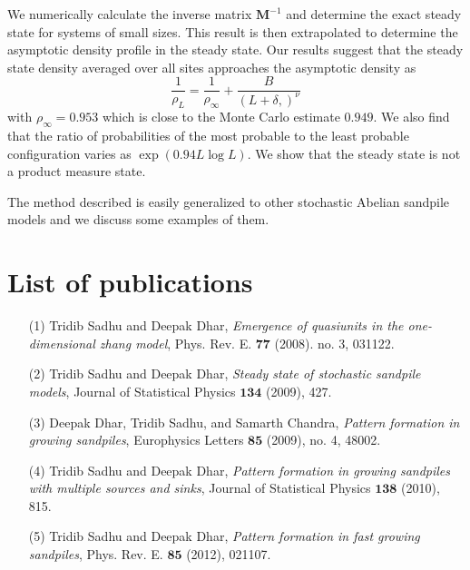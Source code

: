 \documentclass[11pt,a4paper]{book}
\begin{document}
We numerically calculate the inverse matrix $\mathbf{M}^{-1}$ and
determine the exact steady state for systems of small sizes. This
result is then extrapolated to determine the asymptotic density
profile in the steady state. Our results suggest that
the steady state density averaged over all sites approaches the
asymptotic density as
\begin{equation}
\frac{1}{\rho_{L}}=\frac{1}{\rho_{\infty}}+\frac{B}{\left( L+\delta,
\right)^{\nu}}
\end{equation}
with $\rho_{\infty}=0.953$ which is close to the Monte Carlo estimate
$0.949$. We also find that the ratio of probabilities of the most
probable to the least probable configuration varies as $\exp{\left(
0.94 L \log L \right)}$. We show that the steady state is not a
product measure state.

The method described is easily generalized to other stochastic Abelian sandpile
models and we discuss some examples of them.







\chapter{List of publications}
\begin{itemize}
\item[(1)]Tridib Sadhu and Deepak Dhar, \textit{Emergence of quasiunits
in the one-dimensional zhang model}, Phys. Rev. E. $\mathbf{77}$
(2008). no. 3, 031122.
\item[(2)]Tridib Sadhu and Deepak Dhar, \textit{Steady state of
stochastic sandpile models}, Journal of Statistical Physics
$\mathbf{134}$ (2009), 427.
\item[(3)]Deepak Dhar, Tridib Sadhu, and Samarth Chandra,
\textit{Pattern formation in growing sandpiles}, Europhysics
Letters $\mathbf{85}$ (2009), no. 4, 48002.
\item[(4)] Tridib Sadhu and Deepak Dhar, \textit{Pattern formation in
growing sandpiles with multiple sources and sinks}, Journal of
Statistical Physics $\mathbf{138}$ (2010), 815.
\item[(5)] Tridib Sadhu and Deepak Dhar, \textit{Pattern formation in
fast growing sandpiles}, Phys. Rev. E. $\mathbf{85}$
(2012), 021107.
\end{itemize}
\end{document}

